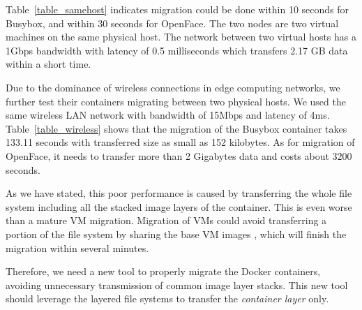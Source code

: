 Table~\ref{table_samehost} indicates migration could be done within 10 seconds for Busybox, and within 30 seconds for OpenFace. The two nodes are two virtual machines on the same physical host. The network between two virtual hosts has a 1Gbps bandwidth with latency of 0.5 milliseconds which transfers 2.17 GB data within a short time.

Due to the dominance of wireless connections in edge computing networks, we further test their containers migrating  between two physical hosts. We used the same wireless LAN network with bandwidth of 15Mbps and latency of 4ms. Table~\ref{table_wireless} shows that the migration of the Busybox container takes 133.11 seconds with transferred size as small as 152 kilobytes. As for migration of OpenFace, it needs to transfer more than 2 Gigabytes data and  costs about 3200 seconds. 

As we have stated, this poor performance is caused by transferring  the whole file system including all the stacked image layers of the container. This is even worse than a mature VM migration. Migration of VMs could avoid transferring a portion of the file system by sharing the base VM images
    \cite{ha2015vmhandoff}, which will finish the migration within several minutes. 

Therefore, we need a new tool to properly migrate the Docker containers, avoiding unnecessary transmission of common image layer stacks.   
This new tool should leverage the layered file systems to  transfer the \textit{container layer} only.

